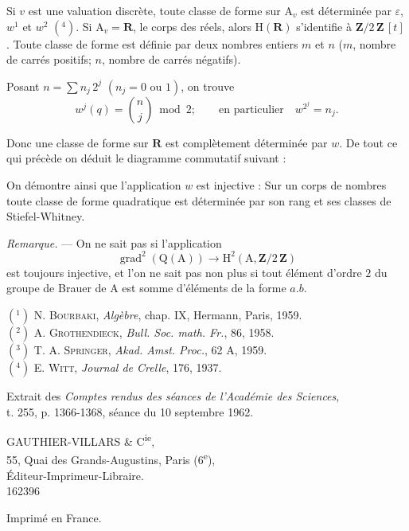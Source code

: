 Si $v$ est une valuation discrète, toute classe de forme sur $\mathrm A_{v}$ est déterminée par $\varepsilon$, $w^{1}$ et $w^{2}$ $(^{4})$. Si $\mathrm A_{v}=\mathbf R$, le corps des réels, alors $\mathrm H(\mathbf R)$ s'identifie à $\mathbf Z/2\,\mathbf Z\,[t]$. Toute classe de forme est définie par deux nombres entiers $m$ et $n$ ($m$, nombre de carrés positifs; $n$, nombre de carrés négatifs).

Posant $n=\displaystyle\sum n_{j}\,2^{j}$ $(n_{j}=0\text{ ou }1)$, on trouve
\[
w^{j}(q)=\binom{n}{j}\bmod 2;\qquad
\text{en particulier}\quad w^{2^{j}}=n_{j}.
\]

Donc une classe de forme sur $\mathbf R$ est complètement déterminée par $w$. De tout ce qui précède on déduit le diagramme commutatif suivant :

On démontre ainsi que l'application $w$ est injective : Sur un corps de nombres toute classe de forme quadratique est déterminée par son rang et ses classes de Stiefel-Whitney.

\emph{Remarque.} --- On ne sait pas si l'application
\[
\operatorname{grad}^{2}(\mathrm Q(\mathrm A))\to\mathrm H^{2}(\mathrm A,\mathbf Z/2\,\mathbf Z)
\]
est toujours injective, et l'on ne sait pas non plus si tout élément d'ordre $2$ du groupe de Brauer de $\mathrm A$ est somme d'éléments de la forme $a.b$.

{\small
$(^{1})$ N. \textsc{Bourbaki}, \emph{Algèbre}, chap. IX, Hermann, Paris, 1959.\\
$(^{2})$ A. \textsc{Grothendieck}, \emph{Bull. Soc. math. Fr.}, 86, 1958.\\
$(^{3})$ T. A. \textsc{Springer}, \emph{Akad. Amst. Proc.}, 62 A, 1959.\\
$(^{4})$ E. \textsc{Witt}, \emph{Journal de Crelle}, 176, 1937.\par}
\begin{center}
Extrait des \emph{Comptes rendus des séances de l'Académie des Sciences},\\
t. 255, p. 1366-1368, séance du 10 septembre 1962.

GAUTHIER-VILLARS \& C\textsuperscript{ie},\\
55, Quai des Grands-Augustins, Paris (6\textsuperscript{e}),\\
Éditeur-Imprimeur-Libraire.\\
162396

Imprimé en France.
\end{center}
